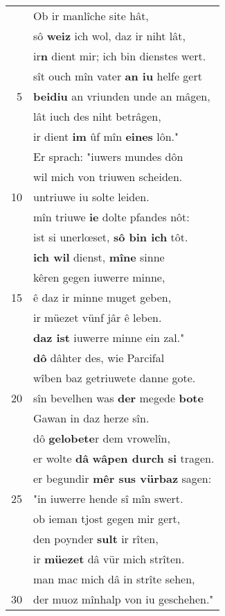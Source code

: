 \documentclass[8pt,a4paper,notitlepage]{article}
\begin{document}
\begin{table}[ht]
\begin{minipage}[t]{0.5\linewidth}
\begin{center}
\end{center}
\begin{tabular}{rl}
 & Ob ir manlîche site hât,\\ 
 & sô \textbf{weiz} ich wol, daz ir niht lât,\\ 
 & ir\textbf{n} dient mir; ich bin dienstes wert.\\ 
 & sît ouch mîn vater \textbf{an iu} helfe gert\\ 
5 & \textbf{beidiu} an vriunden unde an mâgen,\\ 
 & lât iuch des niht betrâgen,\\ 
 & ir dient \textbf{im} ûf mîn \textbf{eines} lôn."\\ 
 & Er sprach: "iuwers mundes dôn\\ 
 & wil mich von triuwen scheiden.\\ 
10 & untriuwe iu solte leiden.\\ 
 & mîn triuwe \textbf{ie} dolte pfandes nôt:\\ 
 & ist si unerlœset, \textbf{sô bin ich} tôt.\\ 
 & \textbf{ich wil} dienst, \textbf{mîne} sinne\\ 
 & kêren gegen iuwerre minne,\\ 
15 & ê daz ir minne muget geben,\\ 
 & ir müezet vünf jâr ê leben.\\ 
 & \textbf{daz ist} iuwerre minne ein zal."\\ 
 & \textbf{dô} dâhter des, wie Parcifal\\ 
 & wîben baz getriuwete danne gote.\\ 
20 & sîn bevelhen was \textbf{der} megede \textbf{bote}\\ 
 & Gawan in daz herze sîn.\\ 
 & dô \textbf{gelobete}r dem vrowelîn,\\ 
 & er wolte \textbf{dâ} \textbf{wâpen durch si} tragen.\\ 
 & er begundir \textbf{mêr sus vürbaz} sagen:\\ 
25 & "in iuwerre hende sî mîn swert.\\ 
 & ob ieman tjost gegen mir gert,\\ 
 & den poynder \textbf{sult} ir rîten,\\ 
 & ir \textbf{müezet} dâ vür mich strîten.\\ 
 & man mac mich dâ in strîte sehen,\\ 
30 & der muoz mînhalp von iu geschehen."\\ 

\end{tabular}
\end{minipage}
\end{table}
\end{document}
